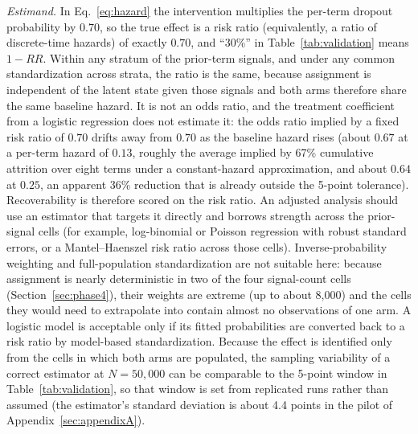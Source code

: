 \documentclass[11pt]{article}
\begin{document}
\emph{Estimand.} In Eq.~\ref{eq:hazard} the intervention multiplies the per-term dropout probability by $0.70$, so the true effect is a risk ratio (equivalently, a ratio of discrete-time hazards) of exactly $0.70$, and ``30\%'' in Table~\ref{tab:validation} means $1-RR$. Within any stratum of the prior-term signals, and under any common standardization across strata, the ratio is the same, because assignment is independent of the latent state given those signals and both arms therefore share the same baseline hazard. It is not an odds ratio, and the treatment coefficient from a logistic regression does not estimate it: the odds ratio implied by a fixed risk ratio of $0.70$ drifts away from $0.70$ as the baseline hazard rises (about $0.67$ at a per-term hazard of $0.13$, roughly the average implied by 67\% cumulative attrition over eight terms under a constant-hazard approximation, and about $0.64$ at $0.25$, an apparent 36\% reduction that is already outside the 5-point tolerance). Recoverability is therefore scored on the risk ratio. An adjusted analysis should use an estimator that targets it directly and borrows strength across the prior-signal cells (for example, log-binomial or Poisson regression with robust standard errors, or a Mantel--Haenszel risk ratio across those cells). Inverse-probability weighting and full-population standardization are not suitable here: because assignment is nearly deterministic in two of the four signal-count cells (Section~\ref{sec:phase4}), their weights are extreme (up to about 8,000) and the cells they would need to extrapolate into contain almost no observations of one arm. A logistic model is acceptable only if its fitted probabilities are converted back to a risk ratio by model-based standardization. Because the effect is identified only from the cells in which both arms are populated, the sampling variability of a correct estimator at $N = 50{,}000$ can be comparable to the 5-point window in Table~\ref{tab:validation}, so that window is set from replicated runs rather than assumed (the estimator's standard deviation is about 4.4 points in the pilot of Appendix~\ref{sec:appendixA}).
\end{document}
